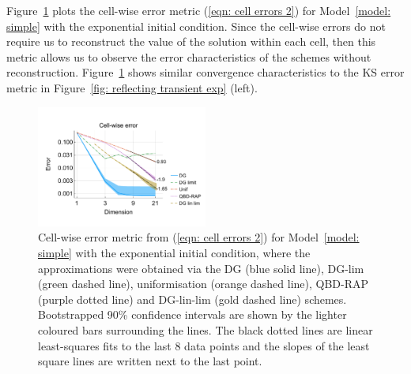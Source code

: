 Figure~\ref{fig: reflecting transient exp cp} plots the cell-wise error metric (\ref{eqn: cell errors 2}) for Model~\ref{model: simple} with the exponential initial condition. Since the cell-wise errors do not require us to reconstruct the value of the solution within each cell, then this metric allows us to observe the error characteristics of the schemes without reconstruction. Figure~\ref{fig: reflecting transient exp cp} shows similar convergence characteristics to the KS error metric in Figure~\ref{fig: reflecting transient exp} (left). 
\begin{figure}[h]
	\centering
	\includegraphics[width=0.5\textwidth,trim={0.75cm 0.8cm 0.25cm 1.25cm},clip]{chapter6/figs/hitting_times_model/reflecting_model/transient_distribution/exp/L1_cell_probs_error_formatted.pdf}
	\caption{Cell-wise error metric from (\ref{eqn: cell errors 2}) for Model~\ref{model: simple} with the exponential initial condition, where the approximations were obtained via the DG (blue solid line), DG-lim (green dashed line), uniformisation (orange dashed line), QBD-RAP (purple dotted line) and DG-lin-lim (gold dashed line) schemes. Bootstrapped 90\% confidence intervals are shown by the lighter coloured bars surrounding the lines. The black dotted lines are linear least-squares fits to the last 8 data points and the slopes of the least square lines are written next to the last point.} 
	\label{fig: reflecting transient exp cp} 
\end{figure}
\exampleFloatBarrier
